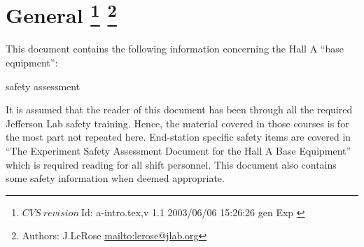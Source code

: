 \section[General]{General
\footnote{
  $CVS~revision~ $Id: a-intro.tex,v 1.1 2003/06/06 15:26:26 gen Exp $ $ 
}
\footnote{Authors: J.LeRose \url{mailto:lerose@jlab.org}}
} 

 This document contains the following information concerning the Hall
 A ``base equipment'':
 \begin{list}{--}{\setlength{\itemsep}{0.cm}}
    \item safety assessment 
 \end{list}


  It is assumed that the reader of this document has
  been through all the required Jefferson Lab safety training. Hence,
  the material covered in those courses is for the most part not
  repeated here. End-station specific safety items are covered in
  ``The Experiment Safety Assessment Document for the Hall A Base
  Equipment'' which is required reading for all shift personnel.  This
  document also contains some safety information when deemed
  appropriate.
	

